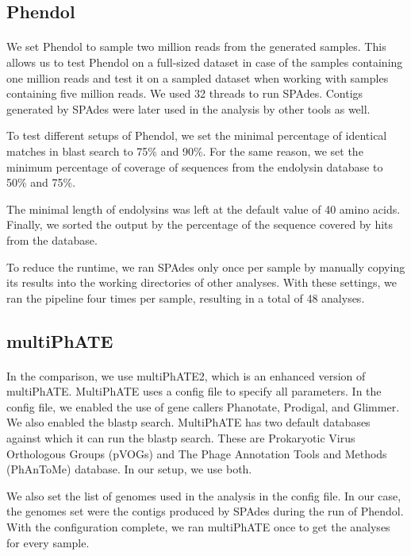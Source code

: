 \subsection{Phendol}
\paragraph*{}
We set Phendol to sample two million reads from the generated samples. This allows us to test Phendol on a full-sized dataset in case of the samples containing one million reads and test it on a sampled dataset when working with samples containing five million reads. We used 32 threads to run SPAdes. Contigs generated by SPAdes were later used in the analysis by other tools as well.

To test different setups of Phendol, we set the minimal percentage of identical matches in blast search to 75\% and 90\%. For the same reason, we set the minimum percentage of coverage of sequences from the endolysin database to 50\% and 75\%.

The minimal length of endolysins was left at the default value of 40 amino acids. Finally, we sorted the output by the percentage of the sequence covered by hits from the database.

To reduce the runtime, we ran SPAdes only once per sample by manually copying its results into the working directories of other analyses. With these settings, we ran the pipeline four times per sample, resulting in a total of 48 analyses.

\subsection{multiPhATE}
\paragraph*{}
In the comparison, we use multiPhATE2, which is an enhanced version of multiPhATE. MultiPhATE uses a config file to specify all parameters. In the config file, we enabled the use of gene callers Phanotate, Prodigal, and Glimmer. We also enabled the blastp search. MultiPhATE has two default databases against which it can run the blastp search. These are Prokaryotic Virus Orthologous Groups (pVOGs) \cite{grazziotin2016prokaryotic} and The Phage Annotation Tools and Methods (PhAnToMe) database. In our setup, we use both.

We also set the list of genomes used in the analysis in the config file. In our case, the genomes set were the contigs produced by SPAdes during the run of Phendol. With the configuration complete, we ran multiPhATE once to get the analyses for every sample.

